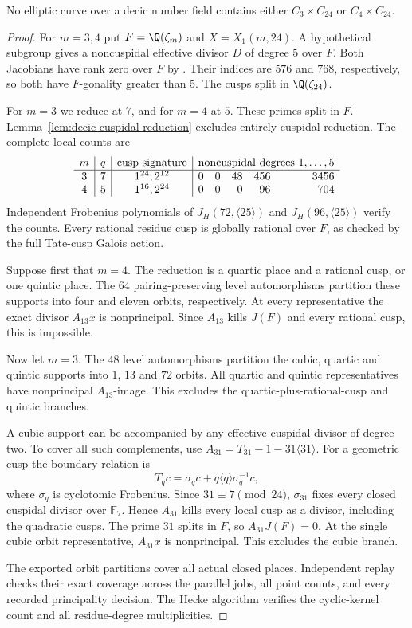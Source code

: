 \begin{proposition}\label{prop:decic324424}
No elliptic curve over a decic number field contains either
$C_3\times C_{24}$ or $C_4\times C_{24}$.
\end{proposition}
\begin{proof}
For $m=3,4$ put $F=\Q(\zeta_m)$ and $X=X_1(m,24)$.
A hypothetical subgroup gives a noncuspidal effective divisor
$D$ of degree $5$ over $F$. Both Jacobians have rank zero over $F$
by \cite[Theorem~4.1]{DS}. Their indices are $576$ and $768$,
respectively, so both have $F$-gonality greater than $5$.
The cusps split in $\Q(\zeta_{24})$.

For $m=3$ we reduce at $7$, and for $m=4$ at $5$.
These primes split in $F$. Lemma~\ref{lem:decic-cuspidal-reduction}
excludes entirely cuspidal reduction. The complete local counts are
\[
\begin{array}{c|c|c|rrrrr}
m&q&\text{cusp signature}&\multicolumn{5}{c}{\text{noncuspidal degrees }1,\ldots,5}\\\hline
3&7&1^{24},2^{12}&0&0&48&456&3456\\
4&5&1^{16},2^{24}&0&0&0&96&704
\end{array}
\]
Independent Frobenius polynomials of $J_H(72,\langle25\rangle)$
and $J_H(96,\langle25\rangle)$ verify the counts.
Every rational residue cusp is globally rational over $F$, as
checked by the full Tate-cusp Galois action.

Suppose first that $m=4$. The reduction is a quartic place and a
rational cusp, or one quintic place. The $64$ pairing-preserving
level automorphisms partition these supports into four and eleven
orbits, respectively. At every representative the exact divisor
$A_{13}x$ is nonprincipal. Since $A_{13}$ kills $J(F)$ and every
rational cusp, this is impossible.

Now let $m=3$. The $48$ level automorphisms partition the cubic,
quartic and quintic supports into $1$, $13$ and $72$ orbits.
All quartic and quintic representatives have nonprincipal
$A_{13}$-image. This excludes the quartic-plus-rational-cusp and
quintic branches.

A cubic support can be accompanied by any effective cuspidal
divisor of degree two. To cover all such complements, use
$A_{31}=T_{31}-1-31\langle31\rangle$.
For a geometric cusp the boundary relation is
\[
 T_q c=\sigma_q c+q\langle q\rangle\sigma_q^{-1}c,
\]
where $\sigma_q$ is cyclotomic Frobenius.
Since $31\equiv7\pmod{24}$, $\sigma_{31}$ fixes every closed
cuspidal divisor over $\mathbb F_7$. Hence $A_{31}$ kills every
local cusp as a divisor, including the quadratic cusps.
The prime $31$ splits in $F$, so $A_{31}J(F)=0$.
At the single cubic orbit representative, $A_{31}x$ is
nonprincipal. This excludes the cubic branch.

The exported orbit partitions cover all actual closed places.
Independent replay checks their exact coverage across the parallel
jobs, all point counts, and every recorded principality decision.
The Hecke algorithm verifies the cyclic-kernel count and all
residue-degree multiplicities.
\end{proof}

